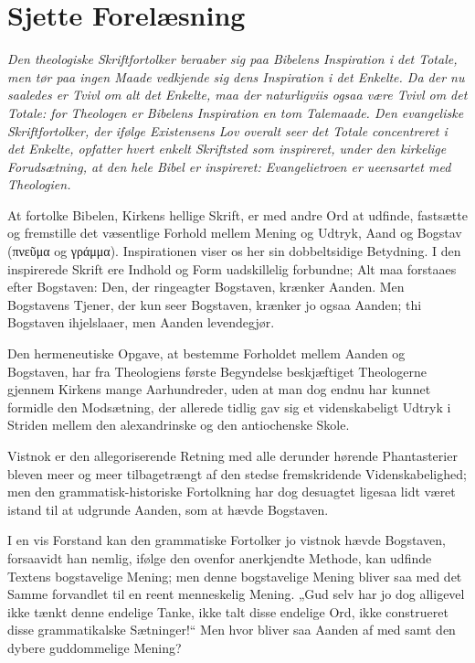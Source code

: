 \documentclass[12pt,a4paper]{book}
\newcommand{\opage}[1]{\marginnote{\footnotesize\textit{[#1]}}}
\begin{document}
\chapter*{Sjette Forelæsning}
\label{ch:forel6}

\begin{center}\itshape
Den theologiske Skriftfortolker beraaber sig paa Bibelens Inspiration i
det Totale, men tør paa ingen Maade vedkjende sig dens Inspiration i det
Enkelte. Da der nu saaledes er Tvivl om alt det Enkelte, maa der
naturligviis ogsaa være Tvivl om det Totale: for Theologen er Bibelens
Inspiration en tom Talemaade. Den evangeliske Skriftfortolker, der ifølge
Existensens Lov overalt seer det Totale concentreret i det Enkelte,
opfatter hvert enkelt Skriftsted som inspireret, under den kirkelige
Forudsætning, at den hele Bibel er inspireret: Evangelietroen er
ueensartet med Theologien.
\end{center}

\opage{66} At fortolke Bibelen, Kirkens hellige Skrift, er med andre Ord at udfinde,
fastsætte og fremstille det væsentlige Forhold mellem Mening og Udtryk, Aand
og Bogstav (πνεῦμα og γράμμα). Inspirationen viser os her sin dobbeltsidige
Betydning. I den inspirerede Skrift ere Indhold og Form uadskillelig
forbundne; Alt maa forstaaes efter Bogstaven: Den, der ringeagter Bogstaven,
krænker Aanden. Men Bogstavens Tjener, der kun seer Bogstaven, krænker jo
ogsaa Aanden; thi Bogstaven ihjelslaaer, men Aanden levendegjør.

Den hermeneutiske Opgave, at bestemme Forholdet mellem Aanden og Bogstaven,
har fra Theologiens første Begyndelse beskjæftiget Theologerne gjennem
Kirkens mange Aarhundreder, uden at man dog endnu har kunnet formidle den
Modsætning,
\opage{67} der allerede tidlig gav sig et videnskabeligt Udtryk i Striden mellem den
alexandrinske og den antiochenske Skole.

Vistnok er den allegoriserende Retning med alle derunder hørende
Phantasterier bleven meer og meer tilbagetrængt af den stedse fremskridende
Videnskabelighed; men den grammatisk-historiske Fortolkning har dog desuagtet
ligesaa lidt været istand til at udgrunde Aanden, som at hævde Bogstaven.

I en vis Forstand kan den grammatiske Fortolker jo vistnok hævde Bogstaven,
forsaavidt han nemlig, ifølge den ovenfor anerkjendte Methode, kan udfinde
Textens bogstavelige Mening; men denne bogstavelige Mening bliver saa med det
Samme forvandlet til en reent menneskelig Mening. „Gud selv har jo dog
alligevel ikke tænkt denne endelige Tanke, ikke talt disse endelige Ord, ikke
construeret disse grammatikalske Sætninger!“ Men hvor bliver saa Aanden af
med samt den dybere guddommelige Mening?
\end{document}

